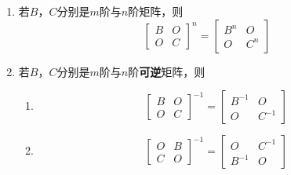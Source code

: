 \documentclass[a4paper,12pt]{article}
\begin{document}
    \begin{enumerate}
        \item 若$B$，$C$分别是$m$阶与$n$阶矩阵，则
        \[
            \begin{bmatrix}
                B & O \\
                O & C
            \end{bmatrix}^n
            = \begin{bmatrix}
                  B^n & O   \\
                  O   & C^n
            \end{bmatrix}
        \]
        \item 若$B$，$C$分别是$m$阶与$n$阶\textbf{可逆}矩阵，则
        \begin{enumerate}
            \item
            \[
                \begin{bmatrix}
                    B & O \\
                    O & C
                \end{bmatrix}^{-1}
                = \begin{bmatrix}
                      B^{-1} & O      \\
                      O      & C^{-1}
                \end{bmatrix}
            \]
            \item
            \[
                \begin{bmatrix}
                    O & B \\
                    C & O
                \end{bmatrix}^{-1}
                = \begin{bmatrix}
                      O      & C^{-1} \\
                      B^{-1} & O
                \end{bmatrix}
            \]
        \end{enumerate}
    \end{enumerate}
\end{document}
